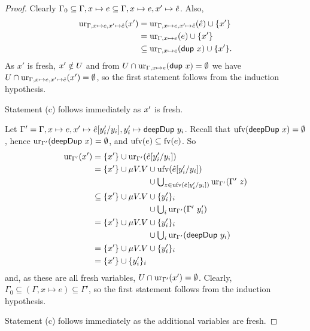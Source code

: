\documentclass[preprint]{sigplanconf}
\theoremstyle{nonumberplain}
\newtheorem{proof}{Proof}
\begin{document}
\begin{proof}
Clearly $\Gamma_0 \subseteq \Gamma, x\mapsto e \subseteq \Gamma, x\mapsto e, x' \mapsto \hat e$. Also,
\begin{align*}
\text{ur}_{\Gamma,x\mapsto e, x'\mapsto \hat e}(x')
&= \text{ur}_{\Gamma, x\mapsto e, x'\mapsto \hat e}(\hat e) \cup \{x'\}\\
&= \text{ur}_{\Gamma, x\mapsto e}(e) \cup \{x'\}\\
&\subseteq \text{ur}_{\Gamma, x\mapsto e}(\text{\textsf{dup}}\ x) \cup \{x'\}.
\end{align*}
As $x'$ is fresh, $x'\notin U$ and from $U \cap \text{ur}_{\Gamma, x\mapsto e}(\text{\textsf{dup}}\ x)= \emptyset$ we have $U \cap \text{ur}_{\Gamma,x\mapsto e, x' \mapsto \hat e}(x')=\emptyset$, so the first statement follows from the induction hypothesis.

Statement (c) follows immediately as $x'$ is fresh.

Let $\Gamma' = \Gamma, x\mapsto e, x'\mapsto \hat e[y'_i/y_i], y'_i \mapsto \text{\textsf{deepDup}}\ y_i$.
Recall that $\text{ufv}(\text{\textsf{deepDup}}\ x)=\emptyset$, hence $\text{ur}_{\Gamma'}(\text{\textsf{deepDup}}\ x) = \emptyset$, and $\text{ufv}(e) \subseteq \text{fv}(e)$. So 
\begin{align*}
\text{ur}_{\Gamma'}(x')
&= \{x'\} \cup \text{ur}_{\Gamma'}(\hat e[y'_i/y_i]) \\
&= \{x'\} \cup \mu V. V
\begin{aligned}[t]
&\cup \text{ufv}(\hat e[y'_i / y_i])\\
&\cup \textstyle\bigcup_{z \in \text{ufv}(\hat e[y'_i / y_i])} \text{ur}_{\Gamma'}(\Gamma' \ z)
\end{aligned}\\
&\subseteq \{x'\} \cup \mu V. V
\begin{aligned}[t]
&\cup \{y'_i\}_i \\
&\cup \textstyle\bigcup_{i} \text{ur}_{\Gamma'}(\Gamma'\ y'_i)
\end{aligned}\\
&= \{x'\} \cup \mu V. V
\begin{aligned}[t]
&\cup \{y'_i\}_i\\
&\cup \textstyle\bigcup_{i} \text{ur}_{\Gamma'}(\text{\textsf{deepDup}}\ y_i)
\end{aligned}\\
&= \{x'\} \cup \mu V. V \cup \{y'_i\}_i  \\
&= \{x'\} \cup \{y'_i\}_i
\end{align*}
and, as these are all fresh variables, $U \cap \text{ur}_{\Gamma'}(x') = \emptyset$. Clearly, $\Gamma_0 \subseteq (\Gamma, x\mapsto e) \subseteq \Gamma'$, so the  first statement follows from the induction hypothesis.

Statement (c) follows immediately as the additional variables are fresh.
\end{proof}
\end{document}
